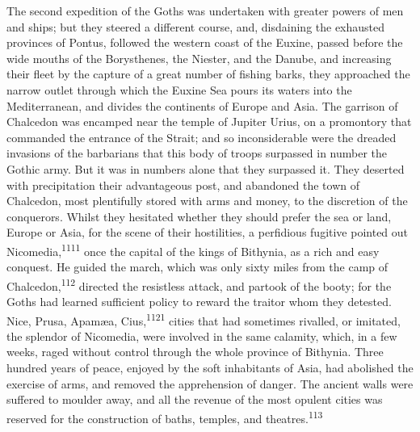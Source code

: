 


The second expedition of the Goths was undertaken with greater
powers of men and ships; but they steered a different course,
and, disdaining the exhausted provinces of Pontus, followed the
western coast of the Euxine, passed before the wide mouths of the
Borysthenes, the Niester, and the Danube, and increasing their
fleet by the capture of a great number of fishing barks, they
approached the narrow outlet through which the Euxine Sea pours
its waters into the Mediterranean, and divides the continents of
Europe and Asia. The garrison of Chalcedon was encamped near the
temple of Jupiter Urius, on a promontory that commanded the
entrance of the Strait; and so inconsiderable were the dreaded
invasions of the barbarians that this body of troops surpassed in
number the Gothic army. But it was in numbers alone that they
surpassed it. They deserted with precipitation their advantageous
post, and abandoned the town of Chalcedon, most plentifully
stored with arms and money, to the discretion of the conquerors.
Whilst they hesitated whether they should prefer the sea or land,
Europe or Asia, for the scene of their hostilities, a perfidious
fugitive pointed out Nicomedia,\textsuperscript{1111} once the capital of the
kings of Bithynia, as a rich and easy conquest. He guided the
march, which was only sixty miles from the camp of Chalcedon,\textsuperscript{112}
directed the resistless attack, and partook of the booty; for the
Goths had learned sufficient policy to reward the traitor whom
they detested. Nice, Prusa, Apamæa, Cius,\textsuperscript{1121} cities that had
sometimes rivalled, or imitated, the splendor of Nicomedia, were
involved in the same calamity, which, in a few weeks, raged
without control through the whole province of Bithynia. Three
hundred years of peace, enjoyed by the soft inhabitants of Asia,
had abolished the exercise of arms, and removed the apprehension
of danger. The ancient walls were suffered to moulder away, and
all the revenue of the most opulent cities was reserved for the
construction of baths, temples, and theatres.\textsuperscript{113}


